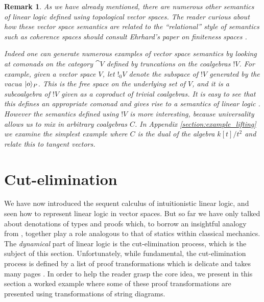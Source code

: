 \documentclass[english,letter paper,12pt,reqno]{article}
\DeclarePairedDelimiter\ket{\lvert}{\rangle}
\theoremstyle{example}
\newtheorem{remark}[theorem]{Remark}
\numberwithin{equation}{section}
\begin{document}
\begin{remark}\label{remark_otherpromotion} As we have already mentioned, there are numerous other semantics of linear logic defined using topological vector spaces. The reader curious about how these vector space semantics are related to the ``relational'' style of semantics such as coherence spaces should consult Ehrhard's paper on finiteness spaces \cite{ehrhard}.

Indeed one can generate numerous examples of vector space semantics by looking at comonads on the category $\cat{V}$ defined by truncations on the coalgebras ${!} V$. For example, given a vector space $V$, let ${!}_0 V$ denote the subspace of ${!} V$ generated by the vacua $\ket{o}_P$. This is the free space on the underlying \emph{set} of $V$, and it is a subcoalgebra of ${!} V$ given as a coproduct of trivial coalgebras. It is easy to see that this defines an appropriate comonad and gives rise to a semantics of linear logic \cite[\S 4.3]{valiron}. However the semantics defined using ${!} V$ is more interesting, because universality allows us to mix in arbitrary coalgebras $C$. In Appendix \ref{section:example_lifting} we examine the simplest example where $C$ is the dual of the algebra $k[t]/t^2$ and relate this to tangent vectors.
\end{remark}

\section{Cut-elimination}\label{section:cut_elim}

We have now introduced the sequent calculus of intuitionistic linear logic, and seen how to represent linear logic in vector spaces. But so far we have only talked about denotations of types and proofs which, to borrow an insightful analogy from \cite[\S III]{girard_towards}, together play a role analogous to that of statics within classical mechanics. The \emph{dynamical} part of linear logic is the cut-elimination process, which is the subject of this section. Unfortunately, while fundamental, the cut-elimination process is defined by a list of proof transformations which is delicate and takes many pages \cite[Section 3]{mellies}. In order to help the reader grasp the core idea, we present in this section a worked example where some of these proof transformations are presented using transformations of string diagrams.
\end{document}
